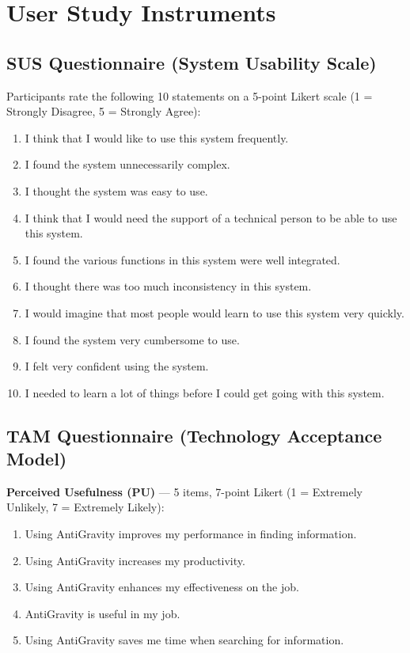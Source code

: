 \chapter{User Study Instruments}
\label{app:user-study}

\section*{SUS Questionnaire (System Usability Scale)}

Participants rate the following 10 statements on a 5-point Likert scale (1 = Strongly Disagree, 5 = Strongly Agree):

\begin{enumerate}
  \item I think that I would like to use this system frequently.
  \item I found the system unnecessarily complex.
  \item I thought the system was easy to use.
  \item I think that I would need the support of a technical person to be able to use this system.
  \item I found the various functions in this system were well integrated.
  \item I thought there was too much inconsistency in this system.
  \item I would imagine that most people would learn to use this system very quickly.
  \item I found the system very cumbersome to use.
  \item I felt very confident using the system.
  \item I needed to learn a lot of things before I could get going with this system.
\end{enumerate}

\section*{TAM Questionnaire (Technology Acceptance Model)}

\textbf{Perceived Usefulness (PU)} --- 5 items, 7-point Likert (1 = Extremely Unlikely, 7 = Extremely Likely):
\begin{enumerate}
  \item Using AntiGravity improves my performance in finding information.
  \item Using AntiGravity increases my productivity.
  \item Using AntiGravity enhances my effectiveness on the job.
  \item AntiGravity is useful in my job.
  \item Using AntiGravity saves me time when searching for information.
\end{enumerate}

